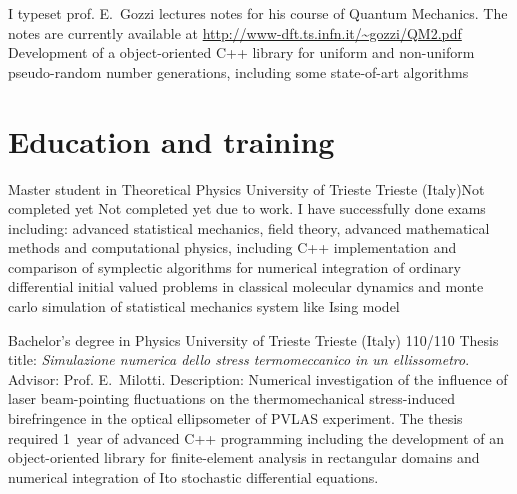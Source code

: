\documentclass[10pt,a4paper]{moderncv}   %
\begin{document}
{   I typeset prof. E.~Gozzi lectures notes for his course of Quantum Mechanics.
   The notes are currently available at 
   \url{http://www-dft.ts.infn.it/~gozzi/QM2.pdf}}
{}{Development of a object-oriented C++ library for uniform and non-uniform
   pseudo-random number generations, including some state-of-art algorithms}

\section{Education and training}
%
{Master student in Theoretical Physics}
{University of Trieste}
{Trieste (Italy)}{Not completed yet}
{Not completed yet due to work. I have successfully done  exams including: advanced statistical mechanics,
   field theory, advanced mathematical methods and computational physics,
   including C++
   implementation and comparison of symplectic algorithms for numerical
   integration of ordinary differential initial valued problems in classical
   molecular dynamics and monte carlo simulation of statistical mechanics
   system like Ising model}

{Bachelor's degree in Physics}
{University of Trieste}
{Trieste (Italy)}
{110/110}
{Thesis title: \emph{Simulazione numerica dello stress termomeccanico in un
      ellissometro}.
   Advisor: Prof. E.~Milotti.
   Description:
Numerical investigation of the influence of laser beam-pointing fluctuations 
on the
   thermomechanical stress-induced birefringence in the optical
   ellipsometer of PVLAS experiment. The thesis required 1~year of advanced C++ programming
   including the development of an object-oriented library for finite-element
   analysis in rectangular domains and numerical integration of Ito stochastic differential
   equations.}
    
\end{document}

